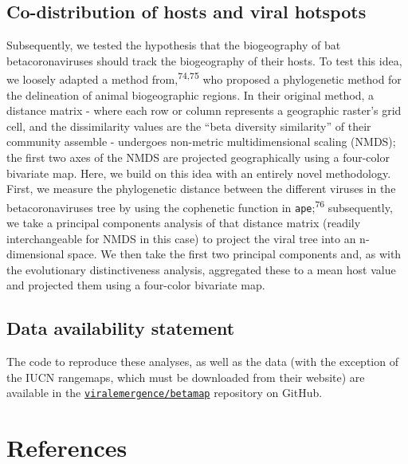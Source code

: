\documentclass[10pt,oneside]{article}
\begin{document}
\hypertarget{co-distribution-of-hosts-and-viral-hotspots}{%
\subsection{Co-distribution of hosts and viral
hotspots}\label{co-distribution-of-hosts-and-viral-hotspots}}

Subsequently, we tested the hypothesis that the biogeography of bat
betacoronaviruses should track the biogeography of their hosts. To test
this idea, we loosely adapted a method from,\textsuperscript{74,75} who
proposed a phylogenetic method for the delineation of animal
biogeographic regions. In their original method, a distance matrix -
where each row or column represents a geographic raster's grid cell, and
the dissimilarity values are the ``beta diversity similarity'' of their
community assemble - undergoes non-metric multidimensional scaling
(NMDS); the first two axes of the NMDS are projected geographically
using a four-color bivariate map. Here, we build on this idea with an
entirely novel methodology. First, we measure the phylogenetic distance
between the different viruses in the betacoronaviruses tree by using the
cophenetic function in \texttt{ape};\textsuperscript{76} subsequently,
we take a principal components analysis of that distance matrix (readily
interchangeable for NMDS in this case) to project the viral tree into an
n-dimensional space. We then take the first two principal components
and, as with the evolutionary distinctiveness analysis, aggregated these
to a mean host value and projected them using a four-color bivariate
map.

\hypertarget{data-availability-statement}{%
\subsection{Data availability
statement}\label{data-availability-statement}}

The code to reproduce these analyses, as well as the data (with the
exception of the IUCN rangemaps, which must be downloaded from their
website) are available in the
\href{https://github.com/viralemergence/betamap}{\texttt{viralemergence/betamap}}
repository on GitHub.

\newpage

\hypertarget{references}{%
\section*{References}\label{references}}
\end{document}
